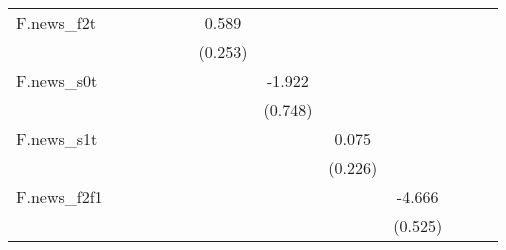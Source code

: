 {\begin{tabular}{l*{12}{c}}
\addlinespace
F.news\_f2t  &                     &                     &                     &                     &                     &       0.589\sym{**} &                     &                     &                     &                     &                     &                     \\
            &                     &                     &                     &                     &                     &     (0.253)         &                     &                     &                     &                     &                     &                     \\
\addlinespace
F.news\_s0t  &                     &                     &                     &                     &                     &                     &      -1.922\sym{**} &                     &                     &                     &                     &                     \\
            &                     &                     &                     &                     &                     &                     &     (0.748)         &                     &                     &                     &                     &                     \\
\addlinespace
F.news\_s1t  &                     &                     &                     &                     &                     &                     &                     &       0.075         &                     &                     &                     &                     \\
            &                     &                     &                     &                     &                     &                     &                     &     (0.226)         &                     &                     &                     &                     \\
\addlinespace
F.news\_f2f1 &                     &                     &                     &                     &                     &                     &                     &                     &      -4.666\sym{***}&                     &                     &                     \\
            &                     &                     &                     &                     &                     &                     &                     &                     &     (0.525)         &                     &                     &                     \\

\end{tabular}}
